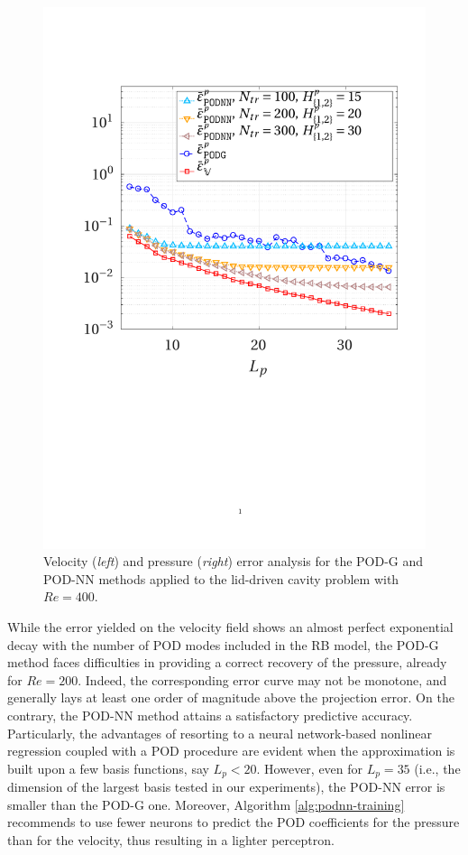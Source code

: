 \documentclass[12pt, a4paper, twoside, openright, notitlepage]{report}
\numberwithin{equation}{chapter}
\theoremstyle{theorem}
\theoremstyle{definition}
\theoremstyle{remark}
\theoremstyle{proposition}
\numberwithin{figure}{chapter}
\begin{document}
\begin{figure}[t!]
			\includegraphics[scale = 0.44, trim = {2cm 9cm 1.5cm 3.5cm}, clip]{dc_400_p_error_vs_rank}
			
			\caption{Velocity (\emph{left}) and pressure (\emph{right}) error analysis for the POD-G and POD-NN methods applied to the lid-driven cavity problem with $Re = 400$.}
			\label{fig:dc-400-error-analysis}
		\end{figure}
				
		While the error yielded on the velocity field shows an almost perfect exponential decay with the number of POD modes included in the RB model, the POD-G method faces difficulties in providing a correct recovery of the pressure, already for $Re = 200$. Indeed, the corresponding error curve may not be monotone, and generally lays at least one order of magnitude above the projection error. On the contrary, the POD-NN method attains a satisfactory predictive accuracy. Particularly, the advantages of resorting to a neural network-based nonlinear regression coupled with a POD procedure are evident when the approximation is built upon a few basis functions, say $L_p < 20$. However, even for $L_p = 35$ (i.e., the dimension of the largest basis tested in our experiments), the POD-NN error is smaller than the POD-G one. Moreover, Algorithm \ref{alg:podnn-training} recommends to use fewer neurons to predict the POD coefficients for the pressure than for the velocity, thus resulting in a lighter perceptron. 
		
\end{document}
